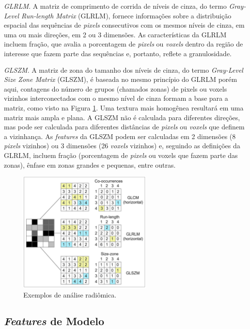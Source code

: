  \textit{GLRLM}. A matriz de comprimento de corrida de níveis de cinza, do termo 
 \textit{Gray-Level Run-length Matrix} (GLRLM), fornece informações sobre a distribuição espacial das sequências de \textit{pixels} consecutivos com os mesmos níveis de cinza, em uma ou mais direções, em 2 ou 3 dimensões. As características da GLRLM incluem fração, que avalia a porcentagem de \textit{pixels} ou \textit{voxels} dentro da região de interesse que fazem parte das sequências e, portanto, reflete a granulosidade. 

\textit{GLSZM}. A matriz de zona do tamanho dos níveis de cinza, do termo \textit{Gray-Level Size Zone Matrix} (GLSZM), é baseada no mesmo princípio do GLRLM porém aqui, contagens do número de grupos (chamados zonas) de pixels ou voxels vizinhos interconectados com o mesmo nível de cinza formam a base para a matriz, como visto na Figura \ref{fig:fig002}. Uma textura mais homogênea resultará em uma matriz mais ampla e plana. A GLSZM não é calculada para diferentes direções, mas pode ser calculada para diferentes distâncias de \textit{pixels} ou \textit{voxels} que definem a vizinhança. As \textit{features} da GLSZM podem ser calculadas em 2 dimensões (8 \textit{pixels} vizinhos) ou 3 dimensões (26 \textit{voxels} vizinhos) e, seguindo as definições da GLRLM, incluem fração (porcentagem de \textit{pixels} ou voxels que fazem parte das zonas), ênfase em zonas grandes e pequenas, entre outras.

\begin{figure}[htbp]
    \centering
    \includegraphics[width=0.6\textwidth]{figures/fig002.png}
    \caption{Exemplos de análise radiômica.}
    \label{fig:fig002}
\end{figure}

\subsection{\textit{Features} de Modelo}

